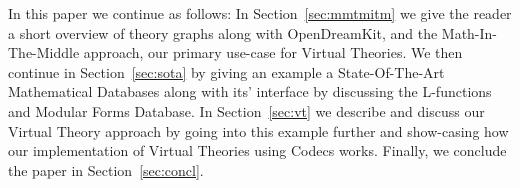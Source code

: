 In this paper we continue as follows:
In Section~\ref{sec:mmtmitm} we give the reader a short overview of \ommt theory graphs along with OpenDreamKit, and the Math-In-The-Middle approach, our primary use-case for Virtual Theories. 
We then continue in Section~\ref{sec:sota} by giving an example a State-Of-The-Art Mathematical Databases along with its' interface by discussing the L-functions and Modular Forms Database. 
In Section~\ref{sec:vt} we describe and discuss our Virtual Theory approach by going into this example further and show-casing how our implementation of Virtual Theories using Codecs works. 
Finally, we conclude the paper in Section~\ref{sec:concl}. 


